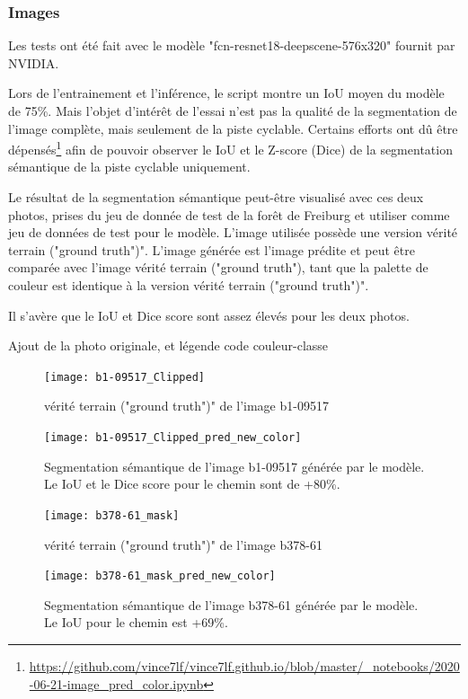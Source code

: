 \subsubsection{Images}
\par Les tests ont été fait avec le modèle "fcn-resnet18-deepscene-576x320" fournit par NVIDIA. 
\par Lors de l'entrainement et l'inférence, le script montre un IoU moyen du modèle de 75\%. Mais l'objet d'intérêt de l'essai n'est pas la qualité de la segmentation de l'image complète, mais seulement de la piste cyclable. Certains efforts ont dû être dépensés\footnote{\url{https://github.com/vince7lf/vince7lf.github.io/blob/master/_notebooks/2020-06-21-image_pred_color.ipynb}} afin de pouvoir observer le IoU et le Z-score (Dice) de la segmentation sémantique de la piste cyclable uniquement.
\par Le résultat de la segmentation sémantique peut-être visualisé avec ces deux photos, prises du jeu de donnée de test de la forêt de Freiburg et utiliser comme jeu de données de test pour le modèle. L'image utilisée possède une version vérité terrain ("ground truth")". L'image générée est l'image prédite et peut être comparée avec l'image vérité terrain ("ground truth"), tant que la palette de couleur est identique à la version vérité terrain ("ground truth")". 
\par Il s'avère que le IoU et Dice score sont assez élevés pour les deux photos. 
\par Ajout de la photo originale, et légende code couleur-classe 
\begin{figure}[H]
   \centering
   \texttt{[image: b1-09517\_Clipped]}
   \caption{vérité terrain ("ground truth")" de l'image b1-09517}
   \label{fig:b1-09517_Clipped}
\end{figure}
\begin{figure}[H]
   \centering
   \texttt{[image: b1-09517\_Clipped\_pred\_new\_color]}
   \caption{Segmentation sémantique de l'image b1-09517 générée par le modèle. Le IoU et le Dice score pour le chemin sont de +80\%.}
   \label{fig:b1-09517_Clipped_pred_new_color}
\end{figure}
\begin{figure}[H]
   \centering
   \texttt{[image: b378-61\_mask]}
   \caption{vérité terrain ("ground truth")" de l'image b378-61}
   \label{fig:b378-61_mask}
\end{figure}
\begin{figure}[H]
   \centering
   \texttt{[image: b378-61\_mask\_pred\_new\_color]}
   \caption{Segmentation sémantique de l'image b378-61 générée par le modèle. Le IoU pour le chemin est +69\%.}
   \label{fig:b378-61_mask_pred_new_color}
\end{figure}
